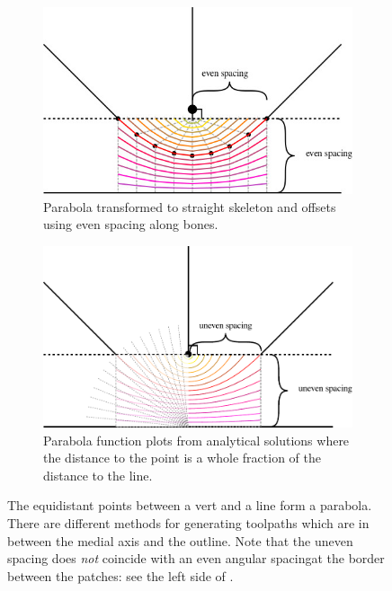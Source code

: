 \begin{figure}[H]
\begin{subfigure}{0.9\columnwidth}
\includegraphics[width=\columnwidth]{sources/method/medial_axis_even_spacing.jpg}
\caption{Parabola transformed to straight skeleton and offsets using even spacing along bones.}
\end{subfigure}
\begin{subfigure}{0.9\columnwidth}
\includegraphics[width=\columnwidth]{sources/method/medial_axis_uneven_spacing.pdf}
\caption{Parabola function plots from analytical solutions where the distance to the point is a whole fraction of the distance to the line.}
\label{medial_axis_parabolas_functions}
\end{subfigure}
\caption{The equidistant points between a vert and a line form a parabola. There are different methods for generating toolpaths which are in between the medial axis and the outline. Note that the uneven spacing does \emph{not} coincide with an even angular spacingat the border between the patches: see the left side of .}
\label{medial_axis_parabolas}
\end{figure}

